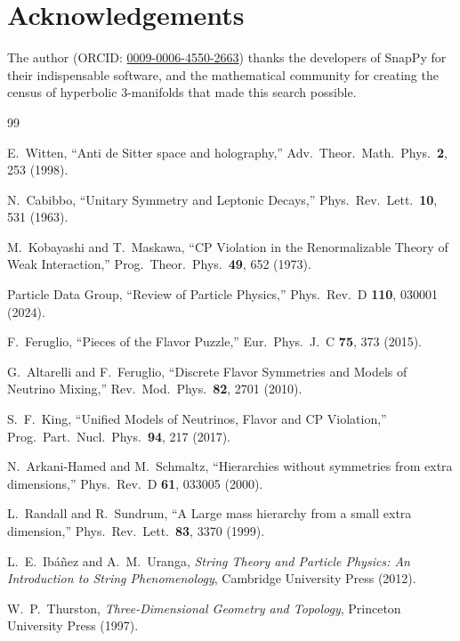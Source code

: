 \documentclass[11pt,a4paper]{article}
\begin{document}
\section*{Acknowledgements}
The author (ORCID: \href{https://orcid.org/0009-0006-4550-2663}{0009-0006-4550-2663})
thanks the developers of SnapPy for their indispensable
software, and the mathematical community for creating the census of
hyperbolic 3-manifolds that made this search possible.


\begin{thebibliography}{99}

E.~Witten,
``Anti de Sitter space and holography,''
Adv.\ Theor.\ Math.\ Phys.\ \textbf{2}, 253 (1998).

N.~Cabibbo,
``Unitary Symmetry and Leptonic Decays,''
Phys.\ Rev.\ Lett.\ \textbf{10}, 531 (1963).

M.~Kobayashi and T.~Maskawa,
``CP Violation in the Renormalizable Theory of Weak Interaction,''
Prog.\ Theor.\ Phys.\ \textbf{49}, 652 (1973).

Particle Data Group,
``Review of Particle Physics,''
Phys.\ Rev.\ D \textbf{110}, 030001 (2024).

F.~Feruglio,
``Pieces of the Flavor Puzzle,''
Eur.\ Phys.\ J.\ C \textbf{75}, 373 (2015).

G.~Altarelli and F.~Feruglio,
``Discrete Flavor Symmetries and Models of Neutrino Mixing,''
Rev.\ Mod.\ Phys.\ \textbf{82}, 2701 (2010).

S.~F.~King,
``Unified Models of Neutrinos, Flavor and CP Violation,''
Prog.\ Part.\ Nucl.\ Phys.\ \textbf{94}, 217 (2017).

N.~Arkani-Hamed and M.~Schmaltz,
``Hierarchies without symmetries from extra dimensions,''
Phys.\ Rev.\ D \textbf{61}, 033005 (2000).

L.~Randall and R.~Sundrum,
``A Large mass hierarchy from a small extra dimension,''
Phys.\ Rev.\ Lett.\ \textbf{83}, 3370 (1999).

L.~E.~Ib\'a\~nez and A.~M.~Uranga,
\emph{String Theory and Particle Physics: An Introduction to String Phenomenology},
Cambridge University Press (2012).

W.~P.~Thurston,
\emph{Three-Dimensional Geometry and Topology},
Princeton University Press (1997).


\end{thebibliography}
\end{document}

